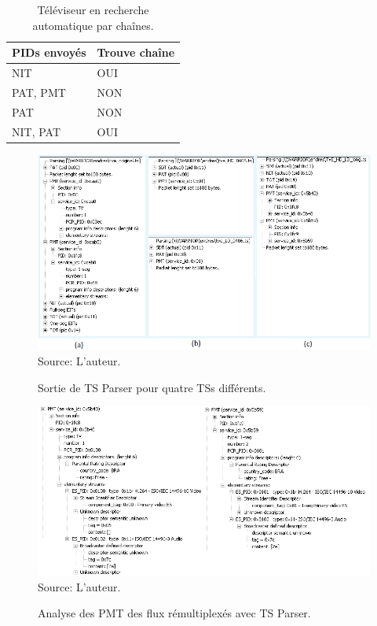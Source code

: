 \documentclass[12pt,a4paper]{article}
\begin{document}
\begin{table}
    \caption {Téléviseur en recherche automatique par chaînes.}
    \begin{center}
\begin{tabular}{|l|l|}
    \hline
    PIDs envoyés & Trouve chaîne \\ \hline
    NIT       & OUI           \\ \hline
    PAT, PMT  & NON            \\ \hline
    PAT       & NON            \\ \hline
    NIT, PAT  & OUI           \\ \hline
    \end{tabular}
	\label{tab_blind_search}
\end{center}
\end{table}

\begin{figure}[!h]
\centering
\caption{Sortie de TS Parser pour quatre TSs différents.}
\includegraphics[width=0.9\linewidth]{pictures/ts_parser_tve_orig_remux.png}
\\Source: L'auteur.
\label{fig:ts_parser_tve_orig_remux}
\end{figure}

\begin{figure}[!h]
\centering
\caption{Analyse des PMT des flux rémultiplexés avec TS Parser.}
\includegraphics[width=0.9\linewidth]{pictures/ts_parser_tve_remux_pmt.png}
\\Source: L'auteur.
\label{fig:ts_parser_tve_remux_pmt}
\end{figure}
\end{document}
